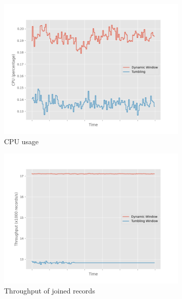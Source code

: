 \begin{figure}
    \begin{subfigure}[b]{0.5\textwidth}
        \includegraphics[width=\textwidth]{fig/constant-rate/cpu_comparison.png}
        \caption{CPU usage}
        \label{fig:constant_cpu}
    \end{subfigure}
    \hfill 
    \begin{subfigure}[b]{0.5\textwidth}
        \includegraphics[width=\textwidth]{fig/constant-rate/throughput_comparison.png}
        \caption{Throughput of joined records}
        \label{fig:constant_thorughput}
    \end{subfigure}
    \begin{subfigure}[b]{0.5\textwidth}

\end{subfigure}
\end{figure}
